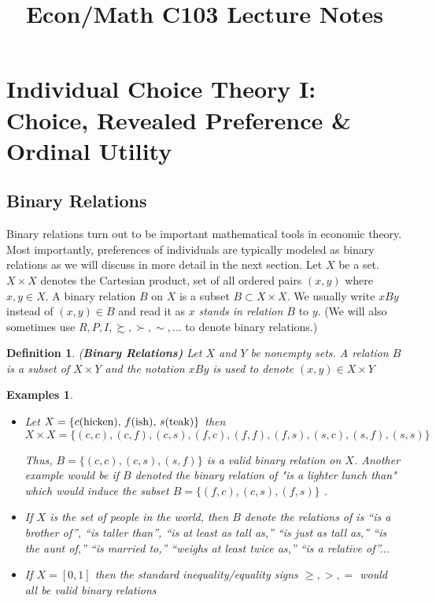 \documentclass[12pt]{article}
\title{\textbf{Econ/Math C103 Lecture Notes}}
\author{}
\date{}
\newtheorem{defin}{Definition}
\newtheorem{unex}[ex]{Examples}
\newcommand{\tn}[1]{\textnormal{#1}}
\newcommand{\name}[1]{\tn{(\textbf{#1)}}}
\newcommand{\pref}{\succsim}
\newcommand{\spref}{\succ}
\newcommand{\3}{\vspace*{3mm}}
\begin{document}
\maketitle
\tableofcontents




\newpage

\section{Individual Choice Theory I: Choice, Revealed Preference \& Ordinal Utility}
\subsection{Binary Relations}

Binary relations turn out to be important mathematical tools in economic theory. Most importantly, preferences of individuals are typically modeled as binary relations as we will discuss in more detail in the next section. Let $X$ be a set. $X \times X$ denotes the Cartesian product, set of all ordered pairs $(x, y)$ where $x, y \in X$. A binary relation $B$ on $X$ is a subset $B \subset X \times X$. We usually write $xBy$ instead of $(x, y) \in B$ and read it as $x$ \emph{stands in relation $B$} to $y$. (We will also sometimes use $R, P , I, \pref, \spref, \sim,$... to denote binary relations.)

\begin{defin} 

\name{Binary Relations} \tn{Let $X$ and $Y$ be nonempty sets. A relation $B$ is a subset of $X \times Y$ and the notation $x B y$ is used to denote $(x,y) \in X \times Y $}

\end{defin}

\begin{unex}
\
\begin{itemize}
\item \tn{Let} $X = \{\tn{$c$(hicken), $f$(ish), $s$(teak)} \}$ \tn{then} 
\[ X \times X = \{(c,c), (c,f), (c,s), (f,c), (f,f), (f,s), (s,c), (s,f), (s,s)\}\]

\tn{Thus, $B = \{(c,c), (c,s), (s,f) \}$ is a valid binary relation on $X$. Another example would be if $B$ denoted the binary relation of "is a lighter lunch than" which would induce the subset $B = \{(f,c), (c,s), (f,s) \}$  }.

\item  \tn{If $X$ is the set of people in the world, then $B$ denote the relations of is “is a brother of”, “is taller than”, “is at
least as tall as,” “is just as tall as,” “is the aunt of,” “is married to,” “weighs at
least twice as,” “is a relative of”...}

\item \tn{If $X = [0,1]$ then the standard inequality/equality signs $\geq, >, =$ would all be valid binary relations}
\end{itemize}

\end{unex}
\end{document}
